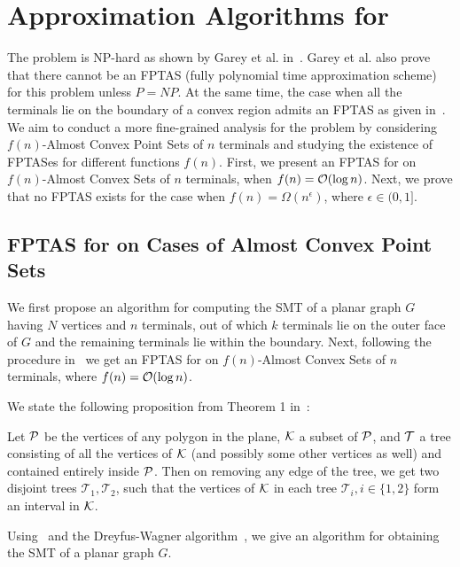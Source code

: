 \section{Approximation Algorithms for \ESMT}\label{sec:apx_esmt}

The \ESMT problem is NP-hard as shown by Garey et al. in~\cite{garey1977complexity}. Garey et al. also prove that there cannot be an FPTAS (fully polynomial time approximation scheme) for this problem unless $P=NP$. At the same time, the case when all the terminals lie on the boundary of a convex region admits an FPTAS as given in~\cite{scott1988convexity}. We aim to conduct a more fine-grained analysis for the problem by considering $f(n)$-Almost Convex Point Sets of $n$ terminals and studying the existence of FPTASes for different functions $f(n)$. First, we present an FPTAS for \ESMT on $f(n)$-Almost Convex Sets of $n$ terminals, when $f(n) = \mathcal{O} (\log n)$. Next, we prove that no FPTAS exists for the case when $f(n) =\Omega (n^\epsilon)$, where $\epsilon \in (0,1]$.

\subsection{FPTAS for \ESMT on Cases of Almost Convex Point Sets}\label{subsec:fptas}

We first propose an algorithm for computing the SMT of a planar graph $G$ having $N$ vertices and $n$ terminals, out of which $k$ terminals lie on the outer face of $G$ and the remaining terminals lie within the boundary. Next, following the procedure in~\cite{scott1988convexity} we get an FPTAS for \ESMT on $f(n)$-Almost Convex Sets of $n$ terminals, where $f(n) = \mathcal{O} (\log n)$.

We state the following proposition from Theorem 1 in~\cite{scott1988convexity}:
\begin{proposition}\label{prop:tree_interval}
    Let $\mathcal{P}$ be the vertices of any polygon in the plane, $\mathcal{K}$ a subset of $\mathcal{P}$, and $\mathcal{T}$ a tree consisting of all the vertices of $\mathcal{K}$ (and possibly some other vertices as well) and contained entirely inside $\mathcal{P}$. Then on removing any edge of the tree, we get two disjoint trees $\mathcal{T}_1, \mathcal{T}_2$, such that the vertices of $\mathcal{K}$ in each tree $\mathcal{T}_i, i \in \{1,2\}$ form an interval in $\mathcal{K}$.
\end{proposition}

Using~ and the Dreyfus-Wagner algorithm~\cite{dreyfus1971steiner}, we give an algorithm for obtaining the SMT of a planar graph $G$. 

